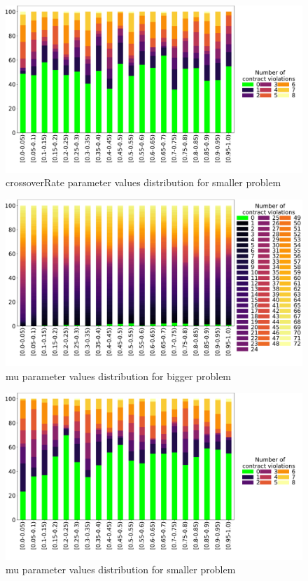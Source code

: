 \clearpage
\begin{figure}
	\centering
	\includegraphics[width=\textwidth]{images/DistrValiditySmall/crossoverRate.pdf}
	\caption[crossoverRate parameter values distribution for smaller problem]{crossoverRate parameter values distribution for smaller problem}
	\label{fig:crossoverRate_DistSmall}
\end{figure}
\begin{figure}
	\centering
	\includegraphics[width=\textwidth]{images/DistrValidityBig/mu.pdf}
	\caption[mu parameter values distribution for bigger problem]{mu parameter values distribution for bigger problem}
	\label{fig:mu_DistBig}
\end{figure}
\begin{figure}
	\centering
	\includegraphics[width=\textwidth]{images/DistrValiditySmall/mu.pdf}
	\caption[mu parameter values distribution for smaller problem]{mu parameter values distribution for smaller problem}
	\label{fig:mu_DistSmall}
\end{figure}

